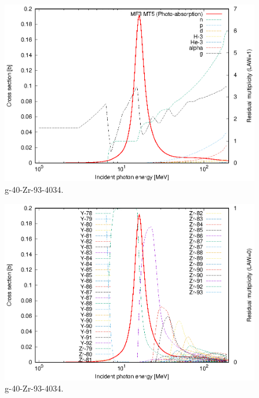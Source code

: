 \begin{figure}
 \includegraphics[width=\linewidth]{eps/g_40-Zr-93_4034.eps}
  \caption{g-40-Zr-93-4034.}
\end{figure}
\begin{figure}
 \includegraphics[width=\linewidth]{eps-law0/g_40-Zr-93_4034.eps}
 \caption{g-40-Zr-93-4034.}
\end{figure}
\newpage \clearpage

